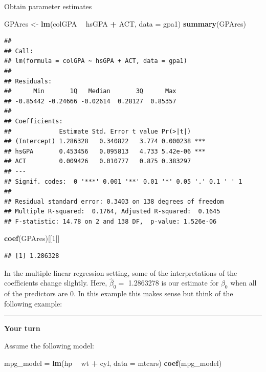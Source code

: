 \documentclass[]{book}
\newenvironment{Shaded}{\begin{snugshade}}{\end{snugshade}}
\newcommand{\DataTypeTok}[1]{\textcolor[rgb]{0.13,0.29,0.53}{#1}}
\newcommand{\DecValTok}[1]{\textcolor[rgb]{0.00,0.00,0.81}{#1}}
\newcommand{\KeywordTok}[1]{\textcolor[rgb]{0.13,0.29,0.53}{\textbf{#1}}}
\newcommand{\NormalTok}[1]{#1}
\newcommand{\OperatorTok}[1]{\textcolor[rgb]{0.81,0.36,0.00}{\textbf{#1}}}
\newcommand{\StringTok}[1]{\textcolor[rgb]{0.31,0.60,0.02}{#1}}
\begin{document}
Obtain parameter estimates

\begin{Shaded}
\begin{Highlighting}[]
\NormalTok{GPAres <-}\StringTok{ }\KeywordTok{lm}\NormalTok{(colGPA }\OperatorTok{~}\StringTok{ }\NormalTok{hsGPA }\OperatorTok{+}\StringTok{ }\NormalTok{ACT, }\DataTypeTok{data =}\NormalTok{ gpa1)}
\KeywordTok{summary}\NormalTok{(GPAres)}
\end{Highlighting}
\end{Shaded}

\begin{verbatim}
## 
## Call:
## lm(formula = colGPA ~ hsGPA + ACT, data = gpa1)
## 
## Residuals:
##      Min       1Q   Median       3Q      Max 
## -0.85442 -0.24666 -0.02614  0.28127  0.85357 
## 
## Coefficients:
##             Estimate Std. Error t value Pr(>|t|)    
## (Intercept) 1.286328   0.340822   3.774 0.000238 ***
## hsGPA       0.453456   0.095813   4.733 5.42e-06 ***
## ACT         0.009426   0.010777   0.875 0.383297    
## ---
## Signif. codes:  0 '***' 0.001 '**' 0.01 '*' 0.05 '.' 0.1 ' ' 1
## 
## Residual standard error: 0.3403 on 138 degrees of freedom
## Multiple R-squared:  0.1764, Adjusted R-squared:  0.1645 
## F-statistic: 14.78 on 2 and 138 DF,  p-value: 1.526e-06
\end{verbatim}

\begin{Shaded}
\begin{Highlighting}[]
\KeywordTok{coef}\NormalTok{(GPAres)[[}\DecValTok{1}\NormalTok{]]}
\end{Highlighting}
\end{Shaded}

\begin{verbatim}
## [1] 1.286328
\end{verbatim}

In the multiple linear regression setting, some of the interpretations of the coefficients change slightly. Here, \(\hat\beta_{0} =\) 1.2863278 is our estimate for \(\beta_{0}\) when all of the predictors are 0. In this example this makes sense but think of the following example:

\begin{center}\rule{0.5\linewidth}{\linethickness}\end{center}

\textbf{Your turn}

Assume the following model:

\begin{Shaded}
\begin{Highlighting}[]
\NormalTok{mpg_model =}\StringTok{ }\KeywordTok{lm}\NormalTok{(hp }\OperatorTok{~}\StringTok{ }\NormalTok{wt }\OperatorTok{+}\StringTok{ }\NormalTok{cyl, }\DataTypeTok{data =}\NormalTok{ mtcars)}
\KeywordTok{coef}\NormalTok{(mpg_model)}
\end{Highlighting}
\end{Shaded}
\end{document}
